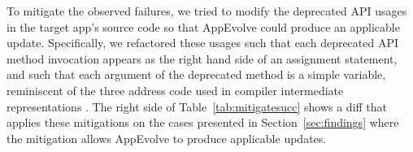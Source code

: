 To mitigate the observed failures, we tried to modify the deprecated API
usages in the target app's source code so that AppEvolve could produce an
applicable update. Specifically, we refactored these usages such that each
deprecated API method invocation appears as the right hand side of an
assignment statement, and such that each argument of the deprecated method
is a simple variable, reminiscent of the three address code used in
compiler intermediate representations \cite{dragon} .  The right side of Table~\ref{tab:mitigatesucc} shows a diff
that applies these mitigations on the cases presented in
Section~\ref{sec:findings} where the mitigation allows AppEvolve
to produce applicable updates.

